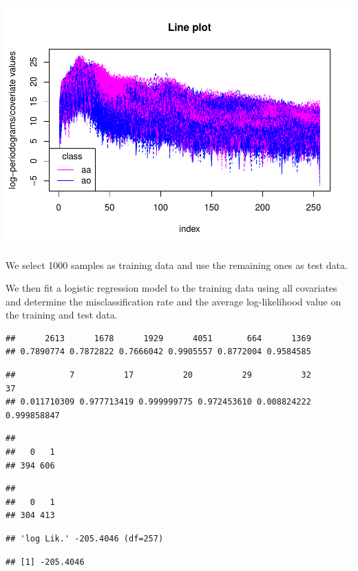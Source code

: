 \documentclass[
]{article}
\begin{document}
\includegraphics{A2_files/figure-latex/unnamed-chunk-20-1.pdf}

We select 1000 samples as training data and use the remaining ones as
test data.

We then fit a logistic regression model to the training data using all
covariates and determine the misclassification rate and the average
log-likelihood value on the training and test data.

\begin{verbatim}
##      2613      1678      1929      4051       664      1369 
## 0.7890774 0.7872822 0.7666042 0.9905557 0.8772004 0.9584585
\end{verbatim}

\begin{verbatim}
##           7          17          20          29          32          37 
## 0.011710309 0.977713419 0.999999775 0.972453610 0.008824222 0.999858847
\end{verbatim}

\begin{verbatim}
## 
##   0   1 
## 394 606
\end{verbatim}

\begin{verbatim}
## 
##   0   1 
## 304 413
\end{verbatim}

\begin{verbatim}
## 'log Lik.' -205.4046 (df=257)
\end{verbatim}

\begin{verbatim}
## [1] -205.4046
\end{verbatim}
\end{document}
